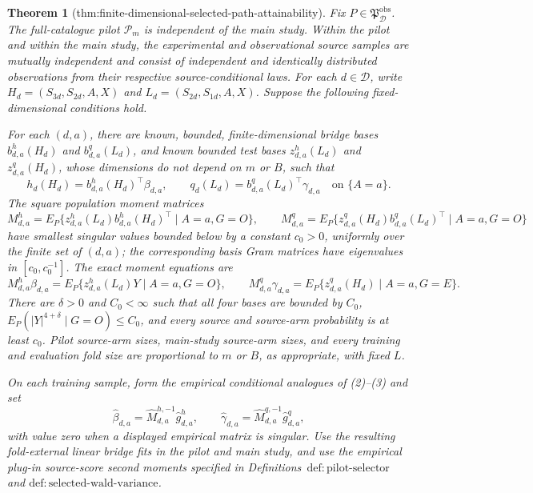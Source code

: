 \documentclass{article}
\newtheorem{theorem}{Theorem}
\begin{document}
\begin{theorem}[thm:finite-dimensional-selected-path-attainability]\label{thm:finite-dimensional-selected-path-attainability}
Fix \(P\in\mathfrak P_{\mathcal D}^{\mathrm{obs}}\).  The full-catalogue pilot \(\mathcal P_m\) is independent of the main study.  Within the pilot and within the main study, the experimental and observational source samples are mutually independent and consist of independent and identically distributed observations from their respective source-conditional laws.  For each \(d\in\mathcal D\), write \(H_d=(S_{3d},S_{2d},A,X)\) and \(L_d=(S_{2d},S_{1d},A,X)\).  Suppose the following fixed-dimensional conditions hold.

For each \((d,a)\), there are known, bounded, finite-dimensional bridge bases \(b^h_{d,a}(H_d)\) and \(b^q_{d,a}(L_d)\), and known bounded test bases \(z^h_{d,a}(L_d)\) and \(z^q_{d,a}(H_d)\), whose dimensions do not depend on \(m\) or \(B\), such that
\[
 h_d(H_d)=b^h_{d,a}(H_d)^\top\beta_{d,a},
 \qquad
 q_d(L_d)=b^q_{d,a}(L_d)^\top\gamma_{d,a}
 \quad\text{on }\{A=a\}.                                    \tag{1}
\]
The square population moment matrices
\[
 M^h_{d,a}=E_P\{z^h_{d,a}(L_d)b^h_{d,a}(H_d)^\top\mid A=a,G=O\},
 \qquad
 M^q_{d,a}=E_P\{z^q_{d,a}(H_d)b^q_{d,a}(L_d)^\top\mid A=a,G=O\} \tag{2}
\]
have smallest singular values bounded below by a constant \(c_0>0\), uniformly over the finite set of \((d,a)\); the corresponding basis Gram matrices have eigenvalues in \([c_0,c_0^{-1}]\).  The exact moment equations are
\[
 M^h_{d,a}\beta_{d,a}
 =E_P\{z^h_{d,a}(L_d)Y\mid A=a,G=O\},
 \qquad
 M^q_{d,a}\gamma_{d,a}
 =E_P\{z^q_{d,a}(H_d)\mid A=a,G=E\}.                         \tag{3}
\]
There are \(\delta>0\) and \(C_0<\infty\) such that all four bases are bounded by \(C_0\), \(E_P(|Y|^{4+\delta}\mid G=O)\le C_0\), and every source and source-arm probability is at least \(c_0\).  Pilot source-arm sizes, main-study source-arm sizes, and every training and evaluation fold size are proportional to \(m\) or \(B\), as appropriate, with fixed \(L\).

On each training sample, form the empirical conditional analogues of (2)--(3) and set
\[
 \widehat\beta_{d,a}=\widehat M_{d,a}^{h,-1}\widehat g^h_{d,a},
 \qquad
 \widehat\gamma_{d,a}=\widehat M_{d,a}^{q,-1}\widehat g^q_{d,a}, \tag{4}
\]
with value zero when a displayed empirical matrix is singular.  Use the resulting fold-external linear bridge fits in the pilot and main study, and use the empirical plug-in source-score second moments specified in Definitions~\(\mathrm{def{:}pilot\text{-}selector}\) and \(\mathrm{def{:}selected\text{-}wald\text{-}variance}\).


\end{theorem}
\end{document}
